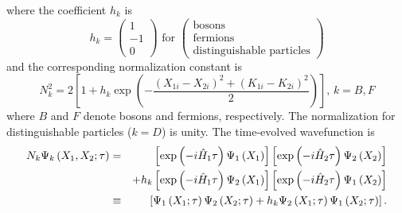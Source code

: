 \documentclass[preprint,aps]{revtex4}
\begin{document}
where the coefficient $h_{k}$ is
\begin{equation}
h_{k}=\left(
\begin{array}{c}
1 \\
-1 \\
0%
\end{array}%
\right) \text{ for }\left(
\begin{array}{c}
\text{bosons} \\
\text{fermions} \\
\text{distinguishable particles}%
\end{array}%
\right)  \label{2.7}
\end{equation}%
and the corresponding normalization constant is
\begin{equation}
N_{k}^{2}=2\left[ 1+h_{k}\exp \left( -\frac{\left( X_{1i}-X_{2i}\right)
^{2}+\left( K_{1i}-K_{2i}\right) ^{2}}{2}\right) \right] \text{, }k=B,F
\label{2.8}
\end{equation}%
where $B$ and $F$ denote bosons and fermions, respectively. The
normalization for distinguishable particles ($k=D$) is unity. The time-evolved wavefunction is
\begin{eqnarray}
N_{k}\Psi _{k}\left( X_{1},X_{2};\tau \right) &=&\left[ \exp \left( -i\hat{H}%
_{1}\tau \right) \Psi _{1}\left( X_{1}\right) \right] \left[ \exp \left( -i%
\hat{H}_{2}\tau \right) \Psi _{2}\left( X_{2}\right) \right]  \notag \\
&&+h_{k}\left[ \exp \left( -i\hat{H}_{1}\tau \right) \Psi _{2}\left(
X_{1}\right) \right] \left[ \exp \left( -i\hat{H}_{2}\tau \right) \Psi
_{1}\left( X_{2}\right) \right]  \notag \\
&\equiv &\left[ \Psi _{1}\left( X_{1};\tau \right) \Psi _{2}\left(
X_{2};\tau \right) +h_{k}\Psi _{2}\left( X_{1};\tau \right) \Psi _{1}\left(
X_{2};\tau \right) \right] .  \label{2.9}
\end{eqnarray}
\end{document}
